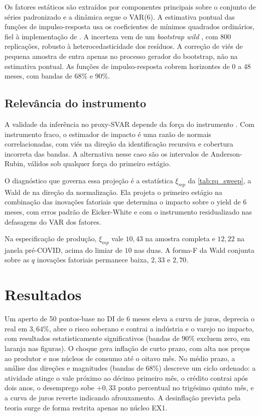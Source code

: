 \documentclass[preprint,authoryear,review,12pt]{elsarticle}
\begin{document}
Os fatores estáticos são extraídos por componentes principais sobre o conjunto de séries padronizado e a dinâmica segue o VAR(6). A estimativa pontual das funções de impulso-resposta usa os coeficientes de mínimos quadrados ordinários, fiel à implementação de \cite{alessi}. A incerteza vem de um \textit{bootstrap wild} \cite{goncalveskilian2004}, com 800 replicações, robusto à heterocedasticidade dos resíduos. A correção de viés de pequena amostra de \cite{kilian1998small} entra apenas no processo gerador do bootstrap, não na estimativa pontual. As funções de impulso-resposta cobrem horizontes de 0 a 48 meses, com bandas de 68\% e 90\%.

\subsection{Relevância do instrumento}

A validade da inferência no proxy-SVAR depende da força do instrumento \cite{montielolea}. Com instrumento fraco, o estimador de impacto é uma razão de normais correlacionadas, com viés na direção da identificação recursiva e cobertura incorreta das bandas. A alternativa nesse caso são os intervalos de Anderson-Rubin, válidos sob qualquer força do primeiro estágio.

O diagnóstico que governa essa projeção é a estatística $\xi_{mp}$ da \autoref{tab:rq_sweep}, a Wald de \cite{montielolea} na direção da normalização. Ela projeta o primeiro estágio na combinação das inovações fatoriais que determina o impacto sobre o yield de 6 meses, com erros padrão de Eicker-White e com o instrumento residualizado nas defasagens do VAR dos fatores.

Na especificação de produção, $\xi_{mp}$ vale $10{,}43$ na amostra completa e $12{,}22$ na janela pré-COVID, acima do limiar de $10$ nas duas. A forma-F da Wald conjunta sobre as $q$ inovações fatoriais permanece baixa, $2{,}33$ e $2{,}70$.



\section{Resultados}
\label{sec:resultados}

Um aperto de 50 pontos-base no DI de 6 meses eleva a curva de juros, deprecia o real em $3{,}64\%$, abre o risco soberano e contrai a indústria e o varejo no impacto, com resultados estatisticamente significativos (bandas de 90\% excluem zero, em laranja nas figuras). O choque gera inflação de curto prazo, com alta nos preços ao produtor e nos núcleos de consumo até o oitavo mês. No médio prazo, a análise das direções e magnitudes (bandas de 68\%) descreve um ciclo ordenado: a atividade atinge o vale próximo ao décimo primeiro mês, o crédito contrai após dois anos, o desemprego sobe $+0{,}33$ ponto percentual no trigésimo quinto mês, e a curva de juros reverte indicando afrouxamento. A desinflação prevista pela teoria surge de forma restrita apenas no núcleo EX1. 
\end{document}
